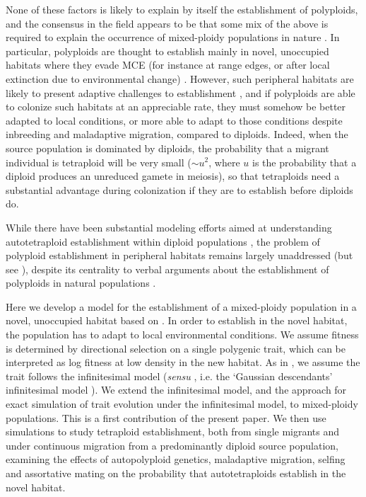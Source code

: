 \documentclass[12pt,a4paper]{article}
\begin{document}
None of these factors is likely to explain by itself the establishment of
polyploids, and the consensus in the field appears to be that some mix of the
above is required to explain the occurrence of mixed-ploidy populations in
nature \citep{kolar2017,mortier2024}.
In particular, polyploids are thought to establish mainly in novel, unoccupied
habitats where they evade MCE (for instance at range edges, or after local
extinction due to environmental change) \citep{griswold2021}.
However, such peripheral habitats are likely to present adaptive challenges to
establishment \citep{kawecki2008adaptation}, and if polyploids are able to
colonize such habitats at an appreciable rate, they must somehow be better
adapted to local conditions, or more able to adapt to those conditions despite
inbreeding and maladaptive migration, compared to diploids.
Indeed, when the source population is dominated by diploids, the probability
that a migrant individual is tetraploid will be very small ($\sim u^2$, where
$u$ is the probability that a diploid produces an unreduced gamete in meiosis),
so that tetraploids need a substantial advantage during colonization if they
are to establish before diploids do.

While there have been substantial modeling efforts aimed at understanding
autotetraploid establishment within diploid populations \citep{levin1975,
felber1991, felber1997, rausch2005, oswald2011, clo2022c}, the problem of
polyploid establishment in peripheral habitats remains largely unaddressed
(but see \cite{griswold2021}),
despite its centrality to verbal arguments about the establishment of
polyploids in natural populations \citep{kolar2017, vandepeer2021, clo2022d}.

Here we develop a model for the establishment of a mixed-ploidy population in a
novel, unoccupied habitat based on \cite{barton2018}.
In order to establish in the novel habitat, the population has to adapt to
local environmental conditions.
We assume fitness is determined by directional selection on a single polygenic
trait, which can be interpreted as log fitness at low density in the new
habitat.
As in \cite{barton2018}, we assume the trait follows the infinitesimal
model (\textit{sensu} \cite{barton2017}, i.e. the `Gaussian descendants'
infinitesimal model \citep{turelli2017}).
We extend the infinitesimal model, and the approach for exact simulation of
trait evolution under the infinitesimal model, to mixed-ploidy populations.
This is a first contribution of the present paper.
We then use simulations to study tetraploid establishment, both from single
migrants and under continuous migration from a predominantly diploid source
population, examining the effects of autopolyploid genetics,
maladaptive migration, selfing and assortative mating on the probability that
autotetraploids establish in the novel habitat.
\end{document}
